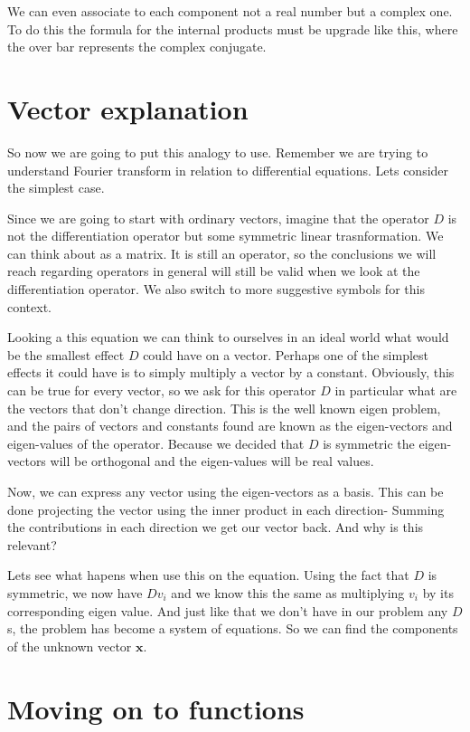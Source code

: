 \documentclass{article}
\newcounter{problem}[section]\setcounter{problem}{1}
\begin{document}
We can even associate to each component not a real number but a complex one.
To do this the formula for the internal products must be upgrade like this, where the over bar represents the complex conjugate.


\section{Vector explanation}

So now we are going to put this analogy to use.
Remember we are trying to understand Fourier transform in relation to differential equations.
Lets consider the simplest case.

Since we are going to start with ordinary vectors, imagine that the operator \(D\) is not the differentiation operator but some symmetric linear trasnformation.
We can think about as a matrix.
It is still an operator, so the conclusions we will reach regarding operators in general will still be valid when we look at the differentiation operator.
We also switch to more suggestive symbols for this context.

Looking a this equation we can think to ourselves in an ideal world what would be the smallest effect $D$ could have on a vector.
Perhaps one of the simplest effects it could have is to simply multiply a vector by a constant.
Obviously, this can be true for every vector, so we ask for this operator $D$ in particular what are the vectors that don't change direction.
This is the well known eigen problem, and the pairs of vectors and constants found are known as the eigen-vectors and eigen-values of the operator.
Because we decided that $D$ is symmetric the eigen-vectors will be orthogonal and the eigen-values will be real values.

Now, we can express any vector using the eigen-vectors as a basis.
This can be done projecting the vector using the inner product in each direction-
Summing the contributions in each direction we get our vector back.
And why is this relevant?

Lets see what hapens when use this on the equation.
Using the fact that $D$ is symmetric, we now have $D v_i$ and we know this the same as multiplying $v_i$ by its corresponding eigen value.
And just like that we don't have in our problem any $D$s, the problem has become a system of equations.
So we can find the components of the unknown vector $\bm x$.

\section{Moving on to functions}
\end{document}
